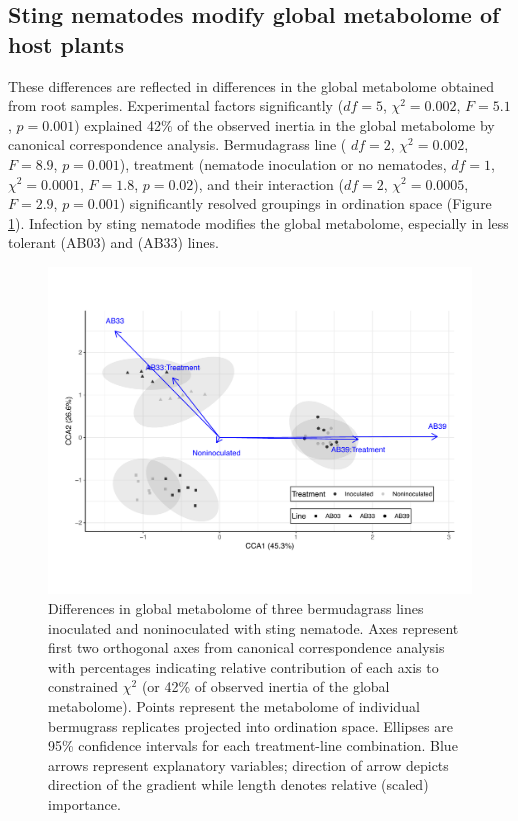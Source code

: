\documentclass[fleqn,10pt]{wlscirep}
\begin{document}
\subsection*{Sting nematodes modify global metabolome of host plants}
These differences are reflected in differences in the global metabolome obtained from root samples.  Experimental factors significantly ($df = 5$, $\chi^2 = 0.002$, $F = 5.1$, $p = 0.001$) explained 42\% of the observed inertia in the global metabolome by canonical correspondence analysis.  Bermudagrass line ( $df = 2$, $\chi^2 = 0.002$, $F = 8.9$, $p = 0.001$), treatment (nematode inoculation or no nematodes, $df = 1$, $\chi^2 = 0.0001$, $F = 1.8$, $p = 0.02$), and their interaction ($df = 2$, $\chi^2 = 0.0005$, $F = 2.9$, $p = 0.001$) significantly resolved groupings in ordination space (Figure \ref{fig:figure2}).  Infection by sting nematode modifies the global metabolome, especially in less tolerant (AB03) and (AB33) lines.


\begin{figure}
\begin{fullwidth}
\includegraphics[width=0.95\linewidth]{figures/publication_figures/figure-2.pdf}
\caption{Differences in global metabolome of three bermudagrass lines inoculated and noninoculated with sting nematode.  Axes represent first two orthogonal axes from canonical correspondence analysis with percentages indicating relative contribution of each axis to constrained $\chi^2$ (or 42\% of observed inertia of the global metabolome).  Points represent the metabolome of individual bermugrass replicates projected into ordination space.  Ellipses are 95\% confidence intervals for each treatment-line combination.  Blue arrows represent explanatory variables; direction of arrow depicts direction of the gradient while length denotes relative (scaled) importance.  }
\label{fig:figure2}
\end{fullwidth}
\end{figure}
\end{document}
